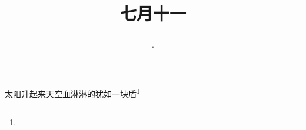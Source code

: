 \title{\date[d=14,m=8,y=2024][year:cn-y,年,month:cn,day:cn,日,·,weekday]·七月十一 }
太阳升起来天空血淋淋的犹如一块盾\footnote{ }

